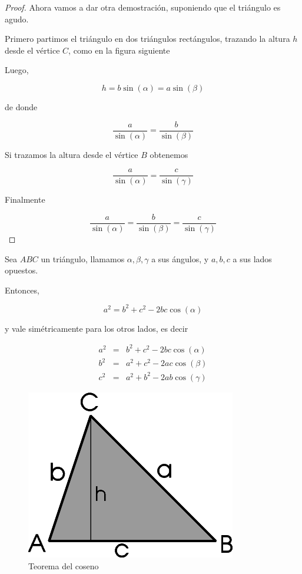 \begin{proof}
Ahora vamos a dar otra demostración, suponiendo que el triángulo es agudo.

Primero partimos el triángulo en dos triángulos rectángulos, trazando la altura $h$ desde el vértice $C$, como en la figura siguiente


Luego,

$$ h = b \sin(\alpha) = a \sin(\beta) $$

de donde

$$ \frac{a}{\sin(\alpha)} = \frac{b}{\sin(\beta)} $$

Si trazamos la altura desde el vértice $B$ obtenemos

$$ \frac{a}{\sin(\alpha)} = \frac{c}{\sin(\gamma)} $$

Finalmente

$$ \frac{a}{\sin(\alpha)} = \frac{b}{\sin(\beta)} = \frac{c}{\sin(\gamma)}$$

\end{proof}

\begin{theorem} \label{teorema_del_coseno}

Sea $ABC$ un triángulo, llamamos $\alpha, \beta, \gamma$ a sus ángulos, y $a,b,c$ a sus lados opuestos.

Entonces,

$$ \boxed{a^2 = b^2 + c^2 - 2bc \cos(\alpha)} $$

y vale simétricamente para los otros lados, es decir

\begin{eqnarray*}
a^2 &=& b^2 + c^2 - 2bc \cos(\alpha) \\
b^2 &=& a^2 + c^2 - 2ac \cos(\beta) \\
c^2 &=& a^2 + b^2 - 2ab \cos(\gamma)
\end{eqnarray*}
\end{theorem}

\begin{figure}[h]
\centering\includegraphics[scale=0.4]{images/01_precalculo/teorema_seno.png}
\caption{Teorema del coseno}
\end{figure}

